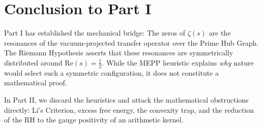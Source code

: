 \documentclass[12pt,a4paper]{article}
\theoremstyle{definition}
\theoremstyle{remark}
\begin{document}
\section{Conclusion to Part I}

Part I has established the mechanical bridge: The zeros of $\zeta(s)$ are the resonances of the vacuum-projected transfer operator over the Prime Hub Graph. The Riemann Hypothesis asserts that these resonances are symmetrically distributed around $\text{Re}(s) = \frac{1}{2}$. While the MEPP heuristic explains \emph{why} nature would select such a symmetric configuration, it does not constitute a mathematical proof. 

In Part II, we discard the heuristics and attack the mathematical obstructions directly: Li's Criterion, excess free energy, the convexity trap, and the reduction of the RH to the gauge positivity of an arithmetic kernel.



\end{document}
